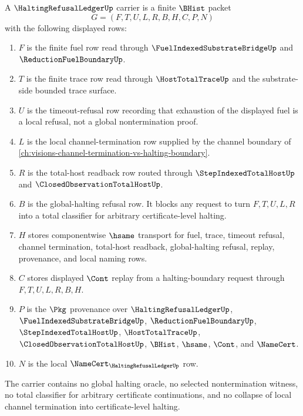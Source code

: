 \begin{definition}
\label{def:halting-refusal-ledger-carrier}
A $\HaltingRefusalLedgerUp$ carrier is a finite $\BHist$ packet
$$
G=(F,T,U,L,R,B,H,C,P,N)
$$
with the following displayed rows:
\begin{enumerate}
\item $F$ is the finite fuel row read through $\FuelIndexedSubstrateBridgeUp$ and $\ReductionFuelBoundaryUp$.
\item $T$ is the finite trace row read through $\HostTotalTraceUp$ and the substrate-side bounded trace surface.
\item $U$ is the timeout-refusal row recording that exhaustion of the displayed fuel is a local refusal, not a global nontermination proof.
\item $L$ is the local channel-termination row supplied by the channel boundary of \autoref{ch:visions-channel-termination-vs-halting-boundary}.
\item $R$ is the total-host readback row routed through $\StepIndexedTotalHostUp$ and $\ClosedObservationTotalHostUp$.
\item $B$ is the global-halting refusal row. It blocks any request to turn $F,T,U,L,R$ into a total classifier for arbitrary certificate-level halting.
\item $H$ stores componentwise $\hsame$ transport for fuel, trace, timeout refusal, channel termination, total-host readback, global-halting refusal, replay, provenance, and local naming rows.
\item $C$ stores displayed $\Cont$ replay from a halting-boundary request through $F,T,U,L,R,B,H$.
\item $P$ is the $\Pkg$ provenance over $\HaltingRefusalLedgerUp$, $\FuelIndexedSubstrateBridgeUp$, $\ReductionFuelBoundaryUp$, $\StepIndexedTotalHostUp$, $\HostTotalTraceUp$, $\ClosedObservationTotalHostUp$, $\BHist$, $\hsame$, $\Cont$, and $\NameCert$.
\item $N$ is the local $\NameCert_{\HaltingRefusalLedgerUp}$ row.
\end{enumerate}
The carrier contains no global halting oracle, no selected nontermination witness, no total classifier for arbitrary certificate continuations, and no collapse of local channel termination into certificate-level halting.
\end{definition}

